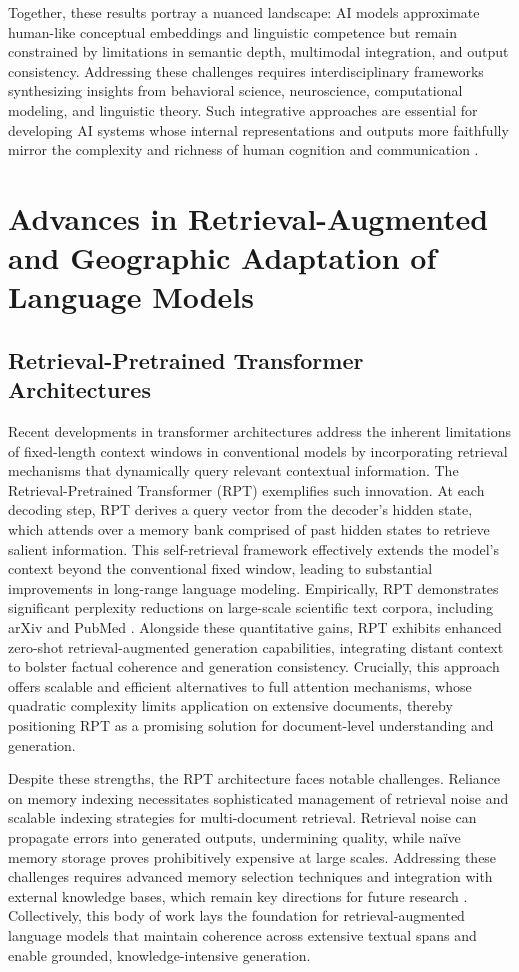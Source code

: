 \documentclass[11pt]{article}
\begin{document}
Together, these results portray a nuanced landscape: AI models approximate human-like conceptual embeddings and linguistic competence but remain constrained by limitations in semantic depth, multimodal integration, and output consistency. Addressing these challenges requires interdisciplinary frameworks synthesizing insights from behavioral science, neuroscience, computational modeling, and linguistic theory. Such integrative approaches are essential for developing AI systems whose internal representations and outputs more faithfully mirror the complexity and richness of human cognition and communication \cite{ref2,ref4,ref5,ref34,ref35}.

\section{Advances in Retrieval-Augmented and Geographic Adaptation of Language Models}

\subsection{Retrieval-Pretrained Transformer Architectures}

Recent developments in transformer architectures address the inherent limitations of fixed-length context windows in conventional models by incorporating retrieval mechanisms that dynamically query relevant contextual information. The Retrieval-Pretrained Transformer (RPT) exemplifies such innovation. At each decoding step, RPT derives a query vector from the decoder’s hidden state, which attends over a memory bank comprised of past hidden states to retrieve salient information. This self-retrieval framework effectively extends the model’s context beyond the conventional fixed window, leading to substantial improvements in long-range language modeling. Empirically, RPT demonstrates significant perplexity reductions on large-scale scientific text corpora, including arXiv and PubMed \cite{ref29}. Alongside these quantitative gains, RPT exhibits enhanced zero-shot retrieval-augmented generation capabilities, integrating distant context to bolster factual coherence and generation consistency. Crucially, this approach offers scalable and efficient alternatives to full attention mechanisms, whose quadratic complexity limits application on extensive documents, thereby positioning RPT as a promising solution for document-level understanding and generation.

Despite these strengths, the RPT architecture faces notable challenges. Reliance on memory indexing necessitates sophisticated management of retrieval noise and scalable indexing strategies for multi-document retrieval. Retrieval noise can propagate errors into generated outputs, undermining quality, while naïve memory storage proves prohibitively expensive at large scales. Addressing these challenges requires advanced memory selection techniques and integration with external knowledge bases, which remain key directions for future research \cite{ref29}. Collectively, this body of work lays the foundation for retrieval-augmented language models that maintain coherence across extensive textual spans and enable grounded, knowledge-intensive generation.
\end{document}
